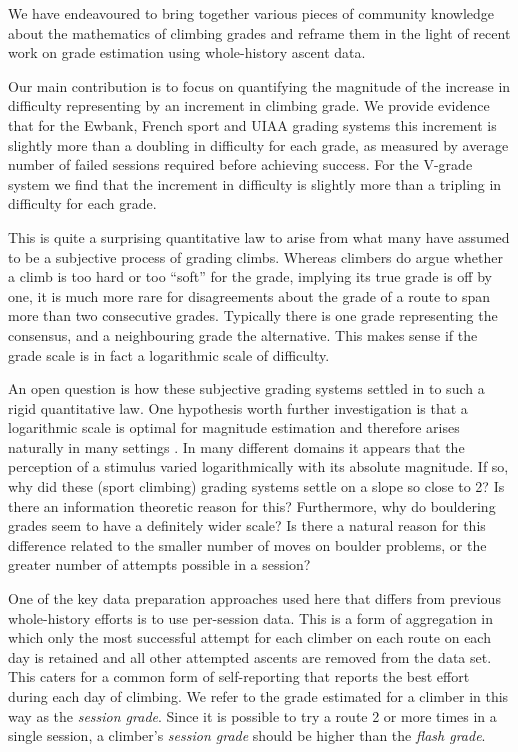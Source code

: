 \documentclass[12pt]{article}
\begin{document}
We have endeavoured to bring together various pieces of community knowledge about the mathematics of climbing grades and reframe them in the light of recent work on grade estimation using whole-history ascent data.

Our main contribution is to focus on quantifying the magnitude of the increase in difficulty representing by an increment in climbing grade. We provide evidence that for the Ewbank, French sport and UIAA grading systems this increment is slightly more than a doubling in difficulty for each grade, as measured by average number of failed sessions required before achieving success. For the V-grade system we find that the increment in difficulty is slightly more than a tripling in difficulty for each grade.

This is quite a surprising quantitative law to arise from what many have assumed to be a subjective process of grading climbs. Whereas climbers do argue whether a climb is too hard or too ``soft'' for the grade, implying its true grade is off by one, it is much more rare for disagreements about the grade of a route to span more than two consecutive grades. Typically there is one grade representing the consensus, and a neighbouring grade the alternative. This makes sense if the grade scale is in fact a logarithmic scale of difficulty.

An open question is how these subjective grading systems settled in to such a rigid quantitative law. One hypothesis worth further investigation is that a logarithmic scale is optimal for magnitude estimation and therefore arises naturally in many settings \citep{portugal2011weber}. In many different domains it appears that the perception of a stimulus varied logarithmically with its absolute magnitude. If so, why did these (sport climbing) grading systems settle on a slope so close to 2? Is there an information theoretic reason for this? Furthermore, why do bouldering grades seem to have a definitely wider scale? Is there a natural reason for this difference related to the smaller number of moves on boulder problems, or the greater number of attempts possible in a session?

One of the key data preparation approaches used here that differs from previous whole-history efforts is to use per-session data. This is a form of aggregation in which only the most successful attempt for each climber on each route on each day is retained and all other attempted ascents are removed from the data set. This caters for a common form of self-reporting that reports the best effort during each day of climbing. We refer to the grade estimated for a climber in this way as the {\it session grade}. Since it is possible to try a route 2 or more times in a single session, a climber's {\it session grade} should be higher than the {\it flash grade}.
\end{document}
